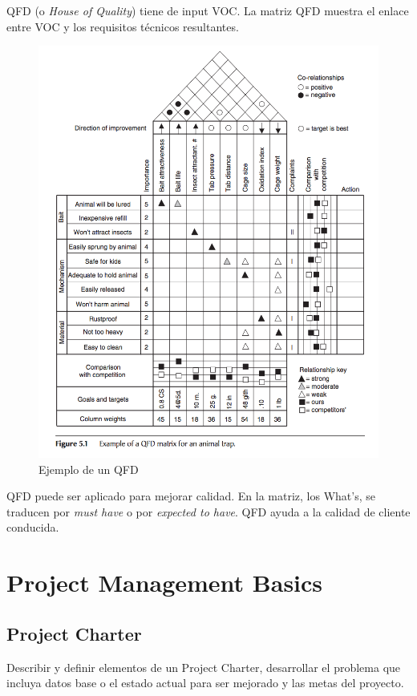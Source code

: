 \documentclass[]{article}
\begin{document}
QFD (o \textit{House of Quality}) tiene de input VOC. La matriz QFD muestra el enlace entre VOC y los requisitos técnicos resultantes.

\begin{figure}[ht!]
	\centering
	\includegraphics[width=150mm]{imagenes/ExampleQFD.png}
	\caption{Ejemplo de un QFD}
	\label{fig:ExampleQFD}
\end{figure}

QFD puede ser aplicado para mejorar calidad. En la matriz, los What's, se traducen por \textit{must have} o por \textit{expected to have}. QFD ayuda a la calidad de cliente conducida.

\section{Project Management Basics}

\subsection{Project Charter}

Describir y definir elementos de un Project Charter, desarrollar el problema que incluya datos base o el estado actual para ser mejorado y las metas del proyecto.
\end{document}

